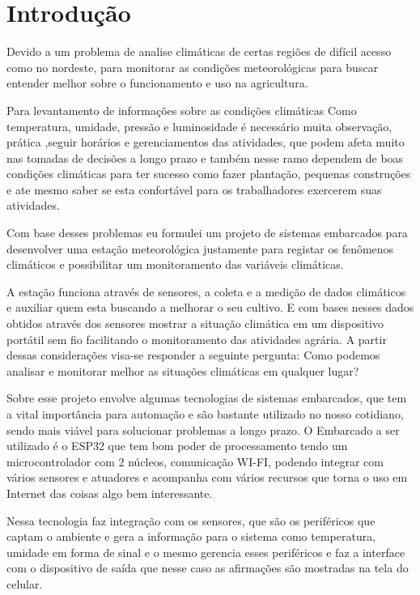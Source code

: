 \chapter{Introdução}
\label{chap:introdução}
Devido a um problema de analise climáticas de certas regiões de difícil acesso como no nordeste, para monitorar as condições meteorológicas para buscar entender melhor sobre o funcionamento e uso na agricultura. 

Para levantamento de informações sobre as condições climáticas Como temperatura, umidade, pressão e luminosidade é necessário muita observação, prática ,seguir horários e gerenciamentos das atividades, que podem afeta muito nas tomadas de decisões a longo prazo  e também nesse ramo dependem de boas condições climáticas para ter sucesso como fazer plantação, pequenas construções e ate mesmo saber se esta confortável para os trabalhadores exercerem suas atividades.  

Com base desses problemas eu formulei um projeto de sistemas embarcados para desenvolver uma estação meteorológica justamente para registar os fenômenos climáticos e possibilitar um monitoramento das variáveis climáticas.

A estação funciona através de sensores, a coleta e a medição de dados climáticos e auxiliar quem esta buscando a melhorar o seu cultivo. E com bases nesses dados obtidos através dos sensores mostrar a situação climática em um dispositivo portátil sem fio facilitando o monitoramento das atividades  agrária. A partir dessas considerações visa-se responder a seguinte pergunta: Como podemos analisar e monitorar melhor as situações climáticas em qualquer lugar? 

Sobre esse projeto envolve algumas tecnologias de sistemas embarcados, que tem a vital importância para automação e são bastante utilizado  no nosso cotidiano, sendo mais viável para solucionar problemas a longo prazo. O Embarcado a ser utilizado é o ESP32 que tem bom poder de processamento tendo um microcontrolador com 2 núcleos, comunicação WI-FI,  podendo integrar com vários sensores e atuadores e acompanha com vários recursos que torna o uso em Internet das coisas algo bem interessante. 

Nessa tecnologia faz integração com os sensores, que são os periféricos que captam o ambiente e gera a informação para o sistema como temperatura, umidade em forma de sinal e o mesmo gerencia esses periféricos e faz a interface com o dispositivo de saída que nesse caso as afirmações são mostradas na tela do celular.  

